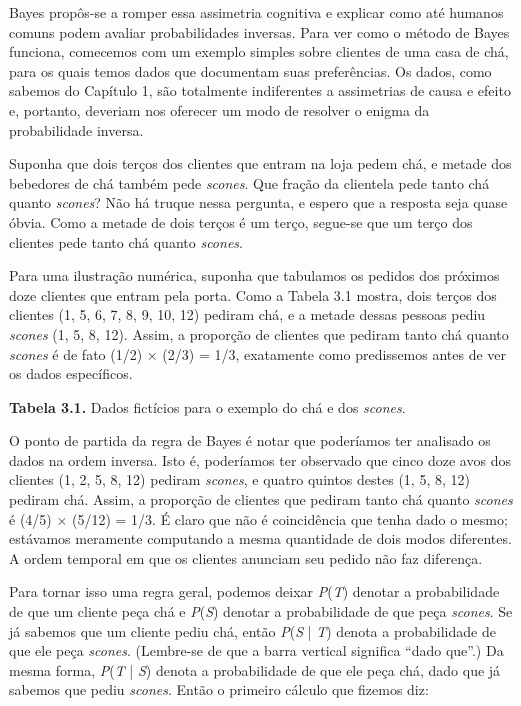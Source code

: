 \documentclass[11pt,a5paper,twoside]{book}
\begin{document}
Bayes propôs-se a romper essa assimetria cognitiva e explicar como até humanos comuns podem avaliar probabilidades inversas. Para ver como o método de Bayes funciona, comecemos com um exemplo simples sobre clientes de uma casa de chá, para os quais temos dados que documentam suas preferências. Os dados, como sabemos do Capítulo 1, são totalmente indiferentes a assimetrias de causa e efeito e, portanto, deveriam nos oferecer um modo de resolver o enigma da probabilidade inversa.

Suponha que dois terços dos clientes que entram na loja pedem chá, e metade dos bebedores de chá também pede \textit{scones}. Que fração da clientela pede tanto chá quanto \textit{scones}? Não há truque nessa pergunta, e espero que a resposta seja quase óbvia. Como a metade de dois terços é um terço, segue-se que um terço dos clientes pede tanto chá quanto \textit{scones}.

Para uma ilustração numérica, suponha que tabulamos os pedidos dos próximos doze clientes que entram pela porta. Como a Tabela 3.1 mostra, dois terços dos clientes (1, 5, 6, 7, 8, 9, 10, 12) pediram chá, e a metade dessas pessoas pediu \textit{scones} (1, 5, 8, 12). Assim, a proporção de clientes que pediram tanto chá quanto \textit{scones} é de fato (1/2) × (2/3) = 1/3, exatamente como predissemos antes de ver os dados específicos.

\textbf{Tabela 3.1.} Dados fictícios para o exemplo do chá e dos \textit{scones}.

O ponto de partida da regra de Bayes é notar que poderíamos ter analisado os dados na ordem inversa. Isto é, poderíamos ter observado que cinco doze avos dos clientes (1, 2, 5, 8, 12) pediram \textit{scones}, e quatro quintos destes (1, 5, 8, 12) pediram chá. Assim, a proporção de clientes que pediram tanto chá quanto \textit{scones} é (4/5) × (5/12) = 1/3. É claro que não é coincidência que tenha dado o mesmo; estávamos meramente computando a mesma quantidade de dois modos diferentes. A ordem temporal em que os clientes anunciam seu pedido não faz diferença.

Para tornar isso uma regra geral, podemos deixar \textit{P}(\textit{T}) denotar a probabilidade de que um cliente peça chá e \textit{P}(\textit{S}) denotar a probabilidade de que peça \textit{scones}. Se já sabemos que um cliente pediu chá, então \textit{P}(\textit{S} | \textit{T}) denota a probabilidade de que ele peça \textit{scones}. (Lembre-se de que a barra vertical significa “dado que”.) Da mesma forma, \textit{P}(\textit{T} | \textit{S}) denota a probabilidade de que ele peça chá, dado que já sabemos que pediu \textit{scones}. Então o primeiro cálculo que fizemos diz:
\end{document}

